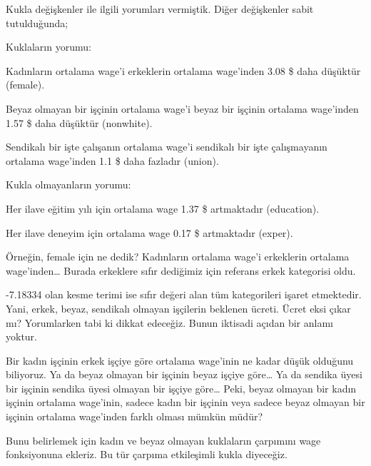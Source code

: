 \documentclass[
]{book}
\newenvironment{Shaded}{\begin{snugshade}}{\end{snugshade}}
\newcommand{\DataTypeTok}[1]{\textcolor[rgb]{0.13,0.29,0.53}{#1}}
\newcommand{\KeywordTok}[1]{\textcolor[rgb]{0.13,0.29,0.53}{\textbf{#1}}}
\newcommand{\NormalTok}[1]{#1}
\newcommand{\OperatorTok}[1]{\textcolor[rgb]{0.81,0.36,0.00}{\textbf{#1}}}
\newcommand{\StringTok}[1]{\textcolor[rgb]{0.31,0.60,0.02}{#1}}
\begin{document}
Kukla değişkenler ile ilgili yorumları vermiştik. Diğer değişkenler sabit tutulduğunda;

Kuklaların yorumu:

Kadınların ortalama wage'i erkeklerin ortalama wage'inden 3.08 \$ daha düşüktür (female).

Beyaz olmayan bir işçinin ortalama wage'i beyaz bir işçinin ortalama wage'inden 1.57 \$ daha düşüktür (nonwhite).

Sendikalı bir işte çalışanın ortalama wage'i sendikalı bir işte çalışmayanın ortalama wage'inden 1.1 \$ daha fazladır (union).

Kukla olmayanların yorumu:

Her ilave eğitim yılı için ortalama wage 1.37 \$ artmaktadır (education).

Her ilave deneyim için ortalama wage 0.17 \$ artmaktadır (exper).

Örneğin, female için ne dedik? Kadınların ortalama wage'i erkeklerin ortalama wage'inden\ldots{} Burada erkeklere sıfır dediğimiz için referans erkek kategorisi oldu.

-7.18334 olan kesme terimi ise sıfır değeri alan tüm kategorileri işaret etmektedir. Yani, erkek, beyaz, sendikalı olmayan işçilerin beklenen ücreti. Ücret eksi çıkar mı? Yorumlarken tabi ki dikkat edeceğiz. Bunun iktisadi açıdan bir anlamı yoktur.

Bir kadın işçinin erkek işçiye göre ortalama wage'inin ne kadar düşük olduğunu biliyoruz. Ya da beyaz olmayan bir işçinin beyaz işçiye göre\ldots{} Ya da sendika üyesi bir işçinin sendika üyesi olmayan bir işçiye göre\ldots{} Peki, beyaz olmayan bir kadın işçinin ortalama wage'inin, sadece kadın bir işçinin veya sadece beyaz olmayan bir işçinin ortalama wage'inden farklı olması mümkün müdür?

Bunu belirlemek için kadın ve beyaz olmayan kuklaların çarpımını wage fonksiyonuna ekleriz. Bu tür çarpıma etkileşimli kukla diyeceğiz.

\begin{Shaded}
\end{Shaded}
\end{document}
